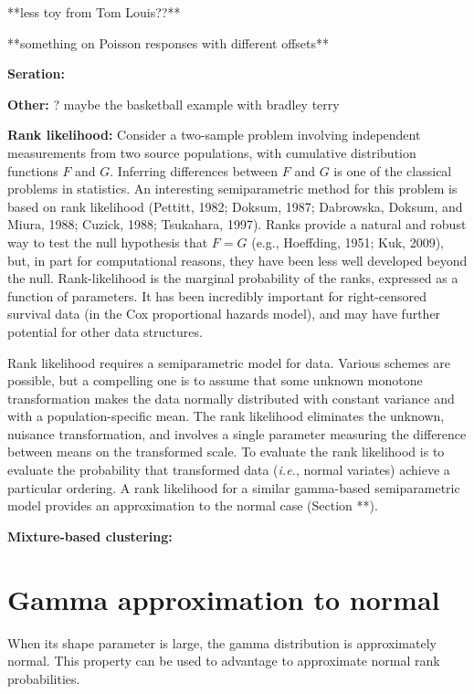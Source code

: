 **less toy from Tom Louis??**

**something on Poisson responses with different offsets**

\noindent
{\bf Seration:} 

\noindent
{\bf Other:}  ? maybe the basketball example with bradley terry


\noindent
{\bf Rank likelihood:} 
Consider a two-sample problem involving independent measurements
 from two source populations, with cumulative distribution functions
 $F$ and $G$.  Inferring differences between $F$ and $G$ is one of the 
 classical problems in statistics.  An interesting semiparametric method for
 this problem is based on rank likelihood (Pettitt, 1982; Doksum, 1987;
 Dabrowska, Doksum, and Miura, 1988; Cuzick, 1988; Tsukahara, 1997). 
  Ranks provide a natural and robust way to test the null 
 hypothesis that $F=G$ (e.g., Hoeffding, 1951; Kuk, 2009),
 but, in part for computational reasons,
 they have been less well developed beyond the null. 
 Rank-likelihood is the marginal probability of the ranks, expressed 
 as a function of parameters. It has been incredibly
 important for right-censored survival data (in the Cox proportional 
 hazards model), and may have further potential for other data structures.  

 Rank likelihood requires a semiparametric model for data.  Various 
 schemes are possible, but a compelling one is to assume that some
 unknown monotone transformation makes the data normally distributed
 with constant variance and with a population-specific mean.  The rank
 likelihood eliminates the unknown, nuisance transformation, and 
 involves a single parameter measuring the difference between 
  means on the transformed scale.
   To evaluate the rank likelihood is to evaluate the probability 
 that transformed data ({\em i.e.}, normal variates) achieve a particular
 ordering.  A rank likelihood for a similar gamma-based semiparametric
 model provides an approximation to the normal case (Section **). 

\noindent
{\bf Mixture-based clustering:}


\section{Gamma approximation to normal}

When its shape parameter is large, the gamma distribution is approximately
normal.  This property can be used to advantage to approximate
normal rank probabilities. 

